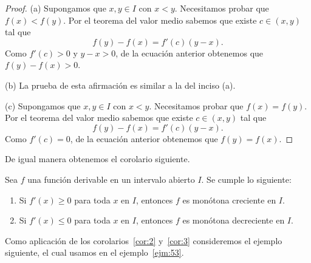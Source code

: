 \documentclass[12pt,a4paper]{book}
\begin{document}
    \begin{proof}
        (a) Supongamos que $x,y\in I$ con $x<y$. Necesitamos probar
        que $f(x)<f(y)$. Por el teorema del valor medio sabemos que existe $c\in
        (x,y)$ tal que
        \begin{equation*}
            f(y)-f(x)=f'(c)(y-x).
        \end{equation*}
        Como $f'(c)>0$ y $y-x>0$, de la ecuación anterior obtenemos que $f(y)-
        f(x)>0$.

        (b) La prueba de esta afirmación es similar a la del inciso (a).

        (c) Supongamos que $x,y\in I$ con $x<y$. Necesitamos probar que $f(x)=
        f(y)$. Por el teorema del valor medio sabemos que existe $c\in(x,y)$ tal que
        \begin{equation*}
            f(y)-f(x)=f'(c)(y-x).
        \end{equation*}
        Como $f'(c)=0$, de la ecuación anterior obtenemos que $f(y)=f(x)$.
    \end{proof}

    De igual manera obtenemos el corolario siguiente.

    \begin{corolario}\label{cor:3}
        Sea $f$ una función derivable en un intervalo abierto $I$. Se
        cumple lo siguiente:
        \begin{enumerate}[nosep]
            \item Si $f'(x)\geq 0$ para toda $x$ en $I$, entonces $f$ es monótona creciente en $I$.
            \item Si $f'(x)\leq 0$ para toda $x$ en $I$, entonces $f$ es monótona decreciente en $I$.
        \end{enumerate}
    \end{corolario}

    Como aplicación de los corolarios~\ref{cor:2} y~\ref{cor:3} consideremos el ejemplo siguiente,
    el cual usamos en el ejemplo~\ref{ejm:53}.
\end{document}
